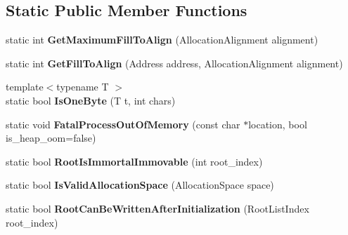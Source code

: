 \subsection*{Static Public Member Functions}
\begin{DoxyCompactItemize}
\item 
static int {\bfseries Get\+Maximum\+Fill\+To\+Align} (Allocation\+Alignment alignment)\hypertarget{classv8_1_1internal_1_1_heap_aa15cca2d6265fd11e04ca74439f1e411}{}\label{classv8_1_1internal_1_1_heap_aa15cca2d6265fd11e04ca74439f1e411}

\item 
static int {\bfseries Get\+Fill\+To\+Align} (Address address, Allocation\+Alignment alignment)\hypertarget{classv8_1_1internal_1_1_heap_ad2b3529d1ff4aad404b8c49460f02541}{}\label{classv8_1_1internal_1_1_heap_ad2b3529d1ff4aad404b8c49460f02541}

\item 
{\footnotesize template$<$typename T $>$ }\\static bool {\bfseries Is\+One\+Byte} (T t, int chars)\hypertarget{classv8_1_1internal_1_1_heap_a6aa91a2a17100b4eb0e4917b98fb157a}{}\label{classv8_1_1internal_1_1_heap_a6aa91a2a17100b4eb0e4917b98fb157a}

\item 
static void {\bfseries Fatal\+Process\+Out\+Of\+Memory} (const char $\ast$location, bool is\+\_\+heap\+\_\+oom=false)\hypertarget{classv8_1_1internal_1_1_heap_a884ceea1a9ae05a482cc62a539231991}{}\label{classv8_1_1internal_1_1_heap_a884ceea1a9ae05a482cc62a539231991}

\item 
static bool {\bfseries Root\+Is\+Immortal\+Immovable} (int root\+\_\+index)\hypertarget{classv8_1_1internal_1_1_heap_af898c54ee9dd90384d271b47236eb6de}{}\label{classv8_1_1internal_1_1_heap_af898c54ee9dd90384d271b47236eb6de}

\item 
static bool {\bfseries Is\+Valid\+Allocation\+Space} (Allocation\+Space space)\hypertarget{classv8_1_1internal_1_1_heap_a6198fff861e1168b5e47456fffe8e676}{}\label{classv8_1_1internal_1_1_heap_a6198fff861e1168b5e47456fffe8e676}

\item 
static bool {\bfseries Root\+Can\+Be\+Written\+After\+Initialization} (Root\+List\+Index root\+\_\+index)\hypertarget{classv8_1_1internal_1_1_heap_aff9681c07d08a186102bf4f167200616}{}\label{classv8_1_1internal_1_1_heap_aff9681c07d08a186102bf4f167200616}


\end{DoxyCompactItemize}
